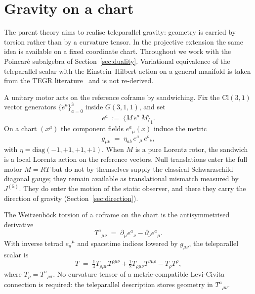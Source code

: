 \documentclass[a4paper]{article}
\begin{document}
\section{Gravity on a chart}
\label{sec:gravity}

The parent theory aims to realise teleparallel gravity: geometry is carried by torsion rather than by a curvature tensor. In the projective extension the same idea is available on a fixed coordinate chart. Throughout we work with the Poincar\'{e} subalgebra of Section~\ref{sec:duality}. Variational equivalence of the teleparallel scalar with the Einstein--Hilbert action on a general manifold is taken from the TEGR literature~\cite{maluf2013} and is not re-derived.

A unitary motor acts on the reference coframe by sandwiching. Fix the \(\mathrm{Cl}(3,1)\) vector generators \(\{\mathring{e}^{a}\}_{a=0}^{3}\) inside \(G(3,1,1)\), and set
\begin{equation}
e^{a} \;:=\; \bigl\langle M\,\mathring{e}^{a}\,\widetilde{M}\bigr\rangle_{1}.
\label{eq:motor-tetrad}
\end{equation}
On a chart \((x^{\mu})\) the component fields \(e^{a}{}_{\mu}(x)\) induce the metric
\begin{equation}
g_{\mu\nu} \;=\; \eta_{ab}\, e^{a}{}_{\mu}\, e^{b}{}_{\nu},
\label{eq:induced-metric}
\end{equation}
with \(\eta=\mathrm{diag}(-1,+1,+1,+1)\). When \(M\) is a pure Lorentz rotor, the sandwich is a local Lorentz action on the reference vectors. Null translations enter the full motor \(M=RT\) but do not by themselves supply the classical Schwarzschild diagonal gauge; they remain available as translational mismatch measured by \(J^{(5)}\). They do enter the motion of the static observer, and there they carry the direction of gravity (Section~\ref{sec:direction}).

The Weitzenb\"{o}ck torsion of a coframe on the chart is the antisymmetrised derivative
\begin{equation}
T^{a}{}_{\mu\nu} \;=\; \partial_{\mu} e^{a}{}_{\nu} - \partial_{\nu} e^{a}{}_{\mu}.
\label{eq:weitzenbock-torsion}
\end{equation}
With inverse tetrad \(e_{a}{}^{\mu}\) and spacetime indices lowered by \(g_{\mu\nu}\), the teleparallel scalar is
\begin{equation}
T \;=\; \tfrac14 T_{\rho\mu\nu}T^{\rho\mu\nu} + \tfrac12 T_{\rho\mu\nu}T^{\nu\mu\rho} - T_{\rho}T^{\rho},
\label{eq:teleparallel-T}
\end{equation}
where \(T_{\rho}=T^{\sigma}{}_{\rho\sigma}\). No curvature tensor of a metric-compatible Levi-Civita connection is required: the teleparallel description stores geometry in \(T^{a}{}_{\mu\nu}\).
\end{document}
